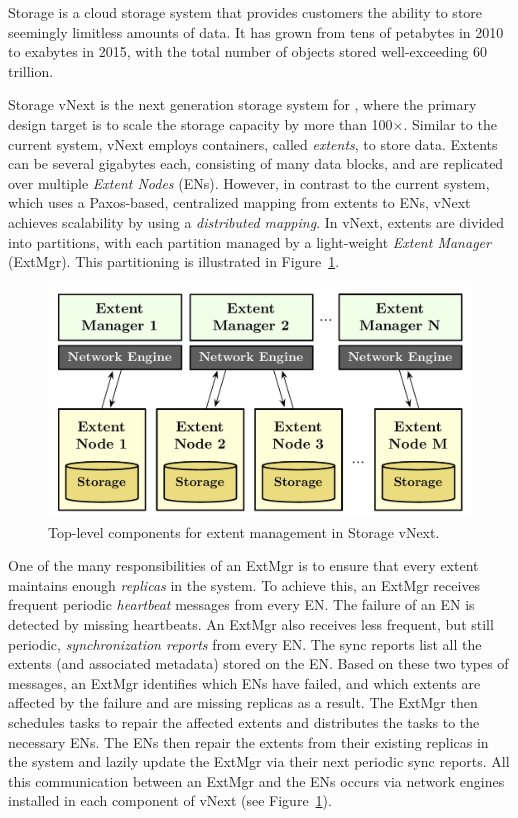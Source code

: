 \Microsoft \Azure Storage is a cloud storage system that provides customers the ability to store seemingly limitless amounts of data. It has grown from tens of petabytes in 2010 to exabytes in 2015, with the total number of objects stored well-exceeding 60 trillion.

\Azure Storage vNext is the next generation storage system for \Microsoft \Azure, where the primary design target is to scale the storage capacity by more than 100$\times$. Similar to the current system, vNext employs containers, called \emph{extents}, to store data. Extents can be several gigabytes each, consisting of many data blocks, and are replicated over multiple \emph{Extent Nodes} (ENs). However, in contrast to the current system, which uses a Paxos-based, centralized mapping from extents to ENs, vNext achieves scalability by using a \emph{distributed mapping}. In vNext, extents are divided into partitions, with each partition managed by a light-weight \emph{Extent Manager} (ExtMgr). This partitioning is illustrated in Figure~\ref{fig:vnext}.

\begin{figure}[t]
\centering
\includegraphics[width=\linewidth]{img/azurestore}
\caption{Top-level components for extent management in \Microsoft \Azure Storage vNext.}
\label{fig:vnext}
\end{figure}

One of the many responsibilities of an ExtMgr is to ensure that every extent maintains enough \emph{replicas} in the system. To achieve this, an ExtMgr receives frequent periodic \emph{heartbeat} messages from every EN. The failure of an EN is detected by missing heartbeats. An ExtMgr also receives less frequent, but still periodic, \emph{synchronization reports} from every EN. The sync reports list all the extents (and associated metadata) stored on the EN. Based on these two types of messages, an ExtMgr identifies which ENs have failed, and which extents are affected by the failure and are missing replicas as a result. The ExtMgr then schedules tasks to repair the affected extents and distributes the tasks to the necessary ENs. The ENs then repair the extents from their existing replicas in the system and lazily update the ExtMgr via their next periodic sync reports. All this communication between an ExtMgr and the ENs occurs via network engines installed in each component of vNext (see Figure~\ref{fig:vnext}).


